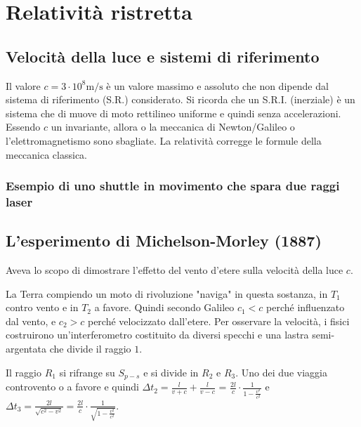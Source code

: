 
\section{Relatività ristretta}

\subsection{Velocità della luce e sistemi di riferimento}

Il valore $c = 3 \cdot 10^8 \si{\meter\per\second}$ è un valore massimo e assoluto che non dipende dal sistema di riferimento (S.R.) considerato.
Si ricorda che un S.R.I. (inerziale) è un sistema che di muove di moto rettilineo uniforme e quindi senza accelerazioni.
Essendo $c$ un invariante, allora o la meccanica di Newton/Galileo o l'elettromagnetismo sono sbagliate.
La relatività corregge le formule della meccanica classica.

\subsubsection{Esempio di uno shuttle in movimento che spara due raggi laser}


\subsection{L'esperimento di Michelson-Morley (1887)}

Aveva lo scopo di dimostrare l'effetto del vento d'etere sulla velocità della luce $c$.


La Terra compiendo un moto di rivoluzione "naviga" in questa sostanza, in $T_1$ contro vento e in $T_2$ a favore.
Quindi secondo Galileo $c_1 < c$ perché influenzato dal vento, e $c_2 > c$ perché velocizzato dall'etere.
Per osservare la velocità, i fisici costruirono un'interferometro costituito da diversi specchi e una lastra semi-argentata che divide il raggio $1$.


Il raggio $R_1$  si rifrange su $S_{p-s}$ e si divide in $R_2$ e $R_3$.
Uno dei due viaggia controvento o a favore e quindi $\Delta t_2 = \frac{l}{v+c} + \frac{l}{v-c}$ = $\frac{2l}{c} \cdot \frac{1}{1-\frac{v^2}{c^2}}$ e $\Delta t_3 = \frac{2l}{\sqrt{c^2-v^2}} = \frac{2l}{c} \cdot \frac{1}{\sqrt{1-\frac{v^2}{c^2}}}$.

